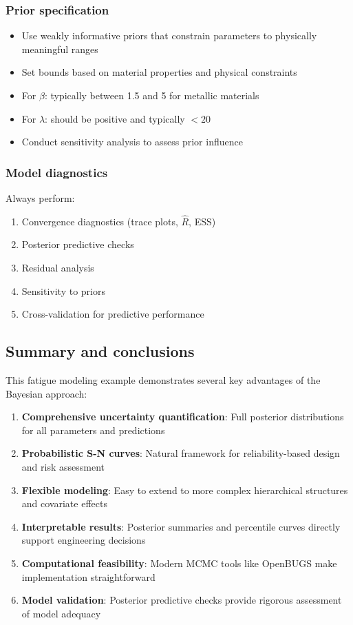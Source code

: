 \subsubsection*{Prior specification}

\begin{itemize}
\item Use weakly informative priors that constrain parameters to physically meaningful ranges
\item Set bounds based on material properties and physical constraints
\item For $\beta$: typically between 1.5 and 5 for metallic materials
\item For $\lambda$: should be positive and typically $< 20$
\item Conduct sensitivity analysis to assess prior influence
\end{itemize}

\subsubsection*{Model diagnostics}

Always perform:
\begin{enumerate}
\item Convergence diagnostics (trace plots, $\hat{R}$, ESS)
\item Posterior predictive checks
\item Residual analysis
\item Sensitivity to priors
\item Cross-validation for predictive performance
\end{enumerate}

\subsection{Summary and conclusions}

This fatigue modeling example demonstrates several key advantages of the Bayesian approach:
\begin{enumerate}
\item \textbf{Comprehensive uncertainty quantification}: Full posterior distributions for all parameters and predictions
\item \textbf{Probabilistic S-N curves}: Natural framework for reliability-based design and risk assessment
\item \textbf{Flexible modeling}: Easy to extend to more complex hierarchical structures and covariate effects
\item \textbf{Interpretable results}: Posterior summaries and percentile curves directly support engineering decisions
\item \textbf{Computational feasibility}: Modern MCMC tools like OpenBUGS make implementation straightforward
\item \textbf{Model validation}: Posterior predictive checks provide rigorous assessment of model adequacy
\end{enumerate}

